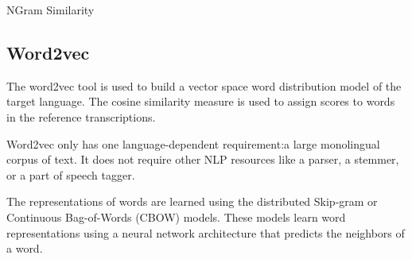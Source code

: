 \begin{block}{NGram Similarity}

\subsection{Word2vec}
\label{sec:word2vec}


The word2vec tool is used to build a vector space word distribution model of the target language. 
The cosine similarity measure is used to assign scores to words in the reference transcriptions. 

Word2vec only has one language-dependent requirement:a large monolingual corpus of text. 
It does not require other NLP resources like a parser, a stemmer, or a part of speech tagger. 

The representations of words are learned using the distributed Skip-gram or Continuous Bag-of-Words (CBOW) models\cite{mikalov2013a}. 
These models learn word representations using a neural network architecture that predicts the neighbors of a word.


\end{block}
